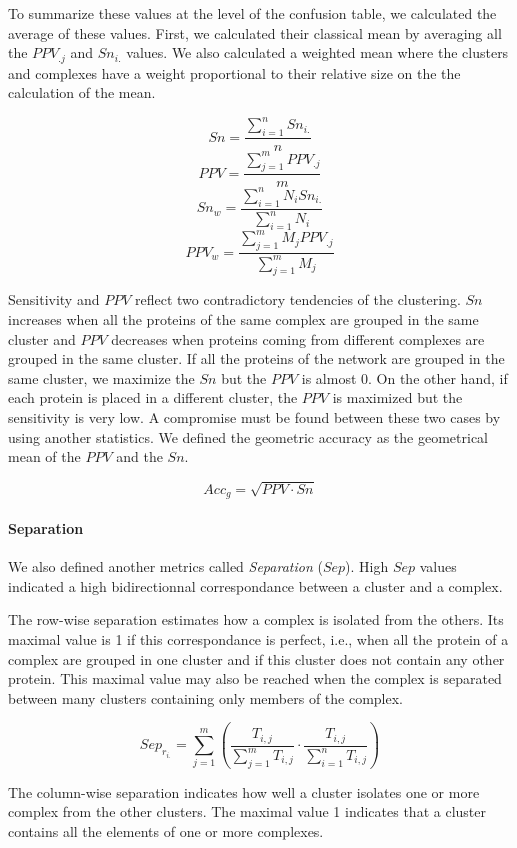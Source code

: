 To summarize these values at the level of the confusion table, we calculated the average of these values. 
First, we calculated their classical mean by averaging all the $PPV_{.j}$ and $Sn_{i.}$ values. We also calculated a weighted mean where the clusters and complexes have a weight proportional to their relative size on the the calculation of the mean.

\[Sn = \frac{\sum_{i=1}^nSn_{i.}}{n}\]
\[PPV = \frac{\sum_{j=1}^mPPV_{.j}}{m}\]
\[Sn_w = \frac{\sum_{i=1}^nN_iSn_{i.}}{\sum_{i=1}^nN_i}\]
\[PPV_w = \frac{\sum_{j=1}^mM_jPPV_{.j}}{\sum_{j=1}^mM_j}\]

Sensitivity and $PPV$ reflect two contradictory tendencies of the clustering. $Sn$ increases when all the proteins of the same complex are grouped in the same cluster and $PPV$ decreases when proteins coming from different complexes are grouped in the same cluster. If all the proteins of the network are grouped in the same cluster, we maximize the $Sn$ but the $PPV$ is almost 0. On the other hand, if each protein is placed in a different cluster, the $PPV$ is maximized  but the sensitivity is very low. A compromise must be found between these two cases by using another statistics. We defined the geometric accuracy as the geometrical mean of the $PPV$ and the $Sn$.

\[Acc_g = \sqrt{PPV \cdot Sn}\]

\paragraph{Separation}

We also defined another metrics called \textit{Separation} ($Sep$). High $Sep$ values indicated a high bidirectionnal correspondance between a cluster and a complex.

The row-wise separation estimates how a complex is isolated from the others. Its maximal value is 1 if this correspondance is perfect, i.e., when all the protein of a complex are grouped in one cluster and if this cluster does not contain any other protein. This maximal value may also be reached when the complex is separated between many clusters containing only members of the complex.

\[Sep_{r_{i.}} = \sum_{j=1}^{m}{(\frac{T_{i,j}}{\sum_{j=1}^{m}{T_{i,j}}} \cdot \frac{T_{i,j}}{\sum_{i=1}^{n}{T_{i,j}}})}\]

The column-wise separation indicates how well a cluster isolates one or more complex from the other clusters. The maximal value 1 indicates that a cluster contains all the elements of one or more complexes.  

